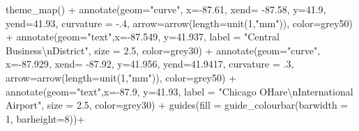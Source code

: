\documentclass[
]{report}
\newenvironment{Shaded}{}{}
\newcommand{\AttributeTok}[1]{\textcolor[rgb]{0.84,0.23,0.29}{#1}}
\newcommand{\DecValTok}[1]{\textcolor[rgb]{0.00,0.36,0.77}{#1}}
\newcommand{\FloatTok}[1]{\textcolor[rgb]{0.00,0.36,0.77}{#1}}
\newcommand{\FunctionTok}[1]{\textcolor[rgb]{0.44,0.26,0.76}{#1}}
\newcommand{\NormalTok}[1]{\textcolor[rgb]{0.14,0.16,0.18}{#1}}
\newcommand{\SpecialCharTok}[1]{\textcolor[rgb]{0.00,0.36,0.77}{#1}}
\newcommand{\StringTok}[1]{\textcolor[rgb]{0.01,0.18,0.38}{#1}}
\begin{document}
\begin{Shaded}
\begin{Highlighting}[]
  \FunctionTok{theme\_map}\NormalTok{() }\SpecialCharTok{+}
  \FunctionTok{annotate}\NormalTok{(}\AttributeTok{geom=}\StringTok{"curve"}\NormalTok{, }\AttributeTok{x=}\SpecialCharTok{{-}}\FloatTok{87.61}\NormalTok{, }\AttributeTok{xend=} \SpecialCharTok{{-}}\FloatTok{87.58}\NormalTok{, }\AttributeTok{y=}\FloatTok{41.9}\NormalTok{, }\AttributeTok{yend=}\FloatTok{41.93}\NormalTok{,}
           \AttributeTok{curvature =} \SpecialCharTok{{-}}\NormalTok{.}\DecValTok{4}\NormalTok{, }\AttributeTok{arrow=}\FunctionTok{arrow}\NormalTok{(}\AttributeTok{length=}\FunctionTok{unit}\NormalTok{(}\DecValTok{1}\NormalTok{,}\StringTok{"mm"}\NormalTok{)), }\AttributeTok{color=}\StringTok{\textquotesingle{}grey50\textquotesingle{}}\NormalTok{) }\SpecialCharTok{+}
  \FunctionTok{annotate}\NormalTok{(}\AttributeTok{geom=}\StringTok{"text"}\NormalTok{,}\AttributeTok{x=}\SpecialCharTok{{-}}\FloatTok{87.549}\NormalTok{, }\AttributeTok{y=}\FloatTok{41.937}\NormalTok{, }\AttributeTok{label =} \StringTok{"Central Business}\SpecialCharTok{\textbackslash{}n}\StringTok{District"}\NormalTok{,}
           \AttributeTok{size =} \FloatTok{2.5}\NormalTok{, }\AttributeTok{color=}\StringTok{\textquotesingle{}grey30\textquotesingle{}}\NormalTok{) }\SpecialCharTok{+}
  \FunctionTok{annotate}\NormalTok{(}\AttributeTok{geom=}\StringTok{"curve"}\NormalTok{, }\AttributeTok{x=}\SpecialCharTok{{-}}\FloatTok{87.929}\NormalTok{, }\AttributeTok{xend=} \SpecialCharTok{{-}}\FloatTok{87.92}\NormalTok{, }\AttributeTok{y=}\FloatTok{41.956}\NormalTok{, }\AttributeTok{yend=}\FloatTok{41.9417}\NormalTok{,}
           \AttributeTok{curvature =}\NormalTok{ .}\DecValTok{3}\NormalTok{, }\AttributeTok{arrow=}\FunctionTok{arrow}\NormalTok{(}\AttributeTok{length=}\FunctionTok{unit}\NormalTok{(}\DecValTok{1}\NormalTok{,}\StringTok{"mm"}\NormalTok{)), }\AttributeTok{color=}\StringTok{\textquotesingle{}grey50\textquotesingle{}}\NormalTok{) }\SpecialCharTok{+}
  \FunctionTok{annotate}\NormalTok{(}\AttributeTok{geom=}\StringTok{"text"}\NormalTok{,}\AttributeTok{x=}\SpecialCharTok{{-}}\FloatTok{87.9}\NormalTok{, }\AttributeTok{y=}\FloatTok{41.93}\NormalTok{, }\AttributeTok{label =} \StringTok{"Chicago O\textquotesingle{}Hare}\SpecialCharTok{\textbackslash{}n}\StringTok{International Airport"}\NormalTok{,}
           \AttributeTok{size =} \FloatTok{2.5}\NormalTok{, }\AttributeTok{color=}\StringTok{\textquotesingle{}grey30\textquotesingle{}}\NormalTok{) }\SpecialCharTok{+}
  \FunctionTok{guides}\NormalTok{(}\AttributeTok{fill =} \FunctionTok{guide\_colourbar}\NormalTok{(}\AttributeTok{barwidth =} \DecValTok{1}\NormalTok{, }\AttributeTok{barheight=}\DecValTok{8}\NormalTok{))}\SpecialCharTok{+}

\end{Highlighting}
\end{Shaded}
\end{document}
